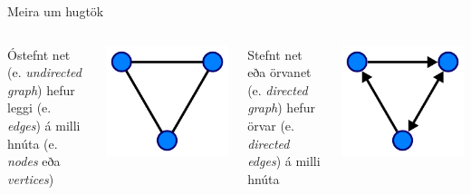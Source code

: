 \documentclass{beamer}
\begin{document}
\begin{frame}{Meira um hugtök}
\begin{columns}
Óstefnt net (e. \emph{undirected graph}) hefur leggi (e. \emph{edges}) á milli hnúta (e. \emph{nodes} eða \emph{vertices})
\begin{center}
\includegraphics[width=0.7\linewidth]{Pics/undirected}
\end{center}
Stefnt net eða örvanet (e. \emph{directed graph}) hefur örvar (e. \emph{directed edges}) á milli hnúta
\begin{center}
\includegraphics[width=0.7\linewidth]{Pics/directed}
\end{center}
\end{columns}
\end{frame}
\end{document}
